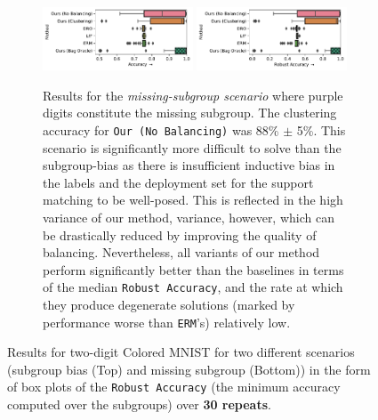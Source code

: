\begin{figure}[t]
  \begin{subfigure}[b]{\textwidth}
  \centering
  \includegraphics[width=0.49\textwidth]{supmatch/figures/cmnist/missing_subgroup/cmnist_2v4_miss_s_acc.pdf}
  \includegraphics[width=0.49\textwidth]{supmatch/figures/cmnist/missing_subgroup/cmnist_2v4_miss_s_acc-min.pdf}
  \caption{
    Results for the \emph{missing-subgroup scenario} where {\color{purple}purple} digits constitute the missing subgroup.
    The clustering accuracy for \texttt{Our (No Balancing)} was 88\% $\pm$ 5\%. 
    This scenario is significantly more difficult to solve than the subgroup-bias as there is insufficient inductive bias in the labels and the deployment set for the support matching to be well-posed. 
    This is reflected in the high variance of our method, variance, however, which can be drastically reduced by improving the quality of balancing.
    Nevertheless, all variants of our method perform significantly better than the baselines in terms of the median \texttt{Robust Accuracy}, and the rate at which they produce degenerate solutions (marked by performance worse than \texttt{ERM}'s) relatively low.
  }%
  \label{fig:cmnist-2v4-miss-s}
  \end{subfigure}
  \caption{
  Results for two-digit Colored MNIST for two different scenarios (subgroup bias (Top) and missing subgroup (Bottom)) in the form of box plots of the \texttt{Robust Accuracy} (the minimum accuracy computed over the subgroups) over \textbf{30 repeats}.
  }
\end{figure}
